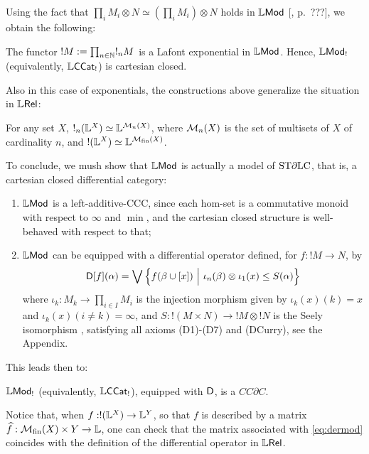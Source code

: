 Using the fact that $\prod_{i}M_{i}\otimes  N\simeq (\prod_{i}M_{i})\otimes N$ holds in $\mathbb{L}\mathsf{Mod}$ [\cite{}, p.~???], we obtain the following:
\begin{theorem}
The functor $!M:= \prod_{n\in \mathbb{N}}!_{n}M$ is a Lafont exponential in $\mathbb{L}\mathsf{Mod}$.
Hence, $\mathbb{L}\mathsf{Mod}_{!}$ (equivalently, $\mathbb{L}\mathsf{CCat}_{!}$) is cartesian closed. 
\end{theorem}

Also in this case of exponentials, the constructions above generalize the situation in $\mathbb{L} \mathsf{Rel}$:
\begin{proposition}
For any set $X$, 
$!_{n}(\mathbb{L}^{X})\simeq \mathbb{L}^{\mathcal{M}_{n}(X)}$, where
$\mathcal{M}_{n}(X)$ is the set of multisets of $X$ of cardinality $n$, and 
$!(\mathbb{L}^{X})\simeq \mathbb{L}^{\mathcal{M}_{\mathrm{fin}}(X)}$. 
\end{proposition}

To conclude, we mush show that $\mathbb{L}\mathsf{Mod}$ is actually a model of $\mathrm{ST}\partial\mathrm{LC}$, that is, a cartesian closed differential category:
\begin{enumerate}
\item $\mathbb{L}\mathsf{Mod}$ is a left-additive-CCC, since each hom-set is a commutative monoid with respect to $\infty$ and $\min$, and the cartesian closed structure is well-behaved with respect to that;

\item $\mathbb{L}\mathsf{Mod}$ can be equipped with a differential operator defined, for $f:!M\to N$, by 
\begin{align}\label{eq:dermod}
\Der[f](\alpha)=
\bigvee\left\{
f(\beta\cup [x]) \ \Big \vert  \ 
\iota_{n}(\beta)\otimes \iota_{1}(x) \leq S(\alpha)
\right\}
\end{align}
where $\iota_{k}: M_{k}\to \prod_{i\in I}M_{i}$ is the injection morphism given by $\iota_{k}(x)( k)=x$ and $\iota_{k}(x)(i\neq k)=\infty$,
and $S: !(M\times N)\to !M\otimes !N$ is the Seely isomorphism \cite{}, 
satisfying all axioms (D1)-(D7) and (DCurry), see the Appendix.
\end{enumerate}

This leads then to:
\begin{theorem}
$\mathbb{L}\mathsf{Mod}_{!}$ (equivalently, $\mathbb{L}\mathsf{CCat}_{!}$), equipped with $\mathsf{D}$, is a $CC\partial C$.
\end{theorem}

Notice that, when $f:!(\mathbb{L}^{X})\to \mathbb{L}^{Y}$, so that $f$ is described by a matrix $\widehat f: \mathcal{M}_{\mathrm{fin}}(X)\times Y\to \mathbb{L}$, one can check that the matrix associated with \eqref{eq:dermod} coincides with the definition of the differential operator in $\mathbb{L} \mathsf{Rel}$.




